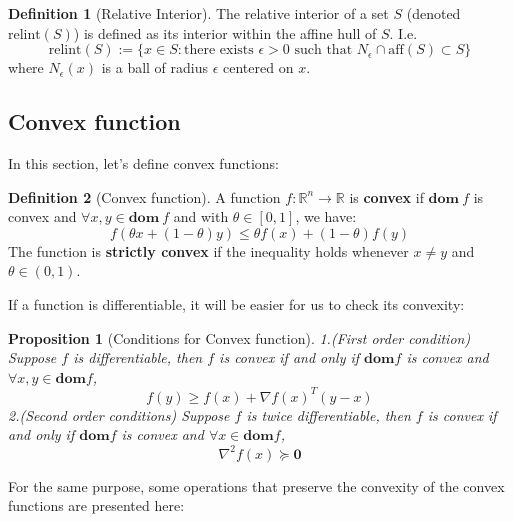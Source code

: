 \documentclass[
]{book}
\newtheorem{proposition}{Proposition}[chapter]
\theoremstyle{definition}
\newtheorem{definition}{Definition}[chapter]
\theoremstyle{definition}
\theoremstyle{definition}
\theoremstyle{definition}
\theoremstyle{remark}
\begin{document}
\begin{definition}[Relative Interior]
\protect\hypertarget{def:relint}{}\label{def:relint}The relative interior of a set \(S\) (denoted \(\text{relint}(S)\)) is defined as its interior within the affine hull of \(S\). I.e.
\[\text{relint}(S):=\{x\in S: \text{there exists } \epsilon>0 \text{ such that }N_\epsilon \cap \text{aff}(S)\subset S\}\]
where \(N_\epsilon(x)\) is a ball of radius \(\epsilon\) centered on \(x\).
\end{definition}

\hypertarget{appconvex-theory-convexfunction}{%
\subsection{Convex function}\label{appconvex-theory-convexfunction}}

In this section, let's define convex functions:

\begin{definition}[Convex function]
\protect\hypertarget{def:defcvxfunc}{}\label{def:defcvxfunc}A function \(f:\mathbb{R}^n\to\mathbb{R}\) is \textbf{convex} if \(\textbf{dom}\ f\) is convex and \(\forall x,y\in \textbf{dom}\ f\) and with \(\theta \in [0,1]\), we have:\[f(\theta x +(1-\theta)y)\leq \theta f(x) + (1-\theta)f(y)\]
The function is \textbf{strictly convex} if the inequality holds whenever \(x\neq y\) and \(\theta\in (0,1)\).
\end{definition}

If a function is differentiable, it will be easier for us to check its convexity:

\begin{proposition}[Conditions for Convex function]
\protect\hypertarget{prp:decidecvx}{}\label{prp:decidecvx}1.(First order condition) Suppose \(f\) is differentiable, then \(f\) is convex if and only if \(\textbf{dom} f\) is convex and \(\forall x,y\in \textbf{dom} f\), \[f(y)\geq f(x) +\nabla f(x)^T(y-x)\]
2.(Second order conditions) Suppose \(f\) is twice differentiable, then \(f\) is convex if and only if \(\textbf{dom} f\) is convex and \(\forall x\in \textbf{dom} f\), \[\nabla^2 f(x) \succeq \textbf{0}\]
\end{proposition}

For the same purpose, some operations that preserve the convexity of the convex functions are presented here:
\end{document}
